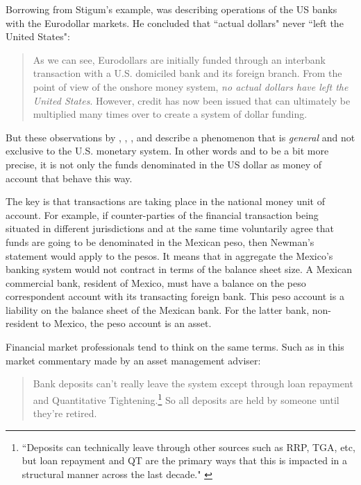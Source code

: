 Borrowing from Stigum's example, \cite{feygin2020} was describing operations of the US banks with the Eurodollar markets. He concluded that ``actual dollars" never ``left the United States":

\begin{quote}
As we can see, Eurodollars are initially funded through an interbank transaction with a U.S. domiciled bank and its foreign branch. From the point of view of the onshore money system, \textit{no actual dollars have left the United States}. However, credit has now been issued that can ultimately be multiplied many times over to create a system of dollar funding. \citep[emphasis added]{feygin2020}
\end{quote}

But these observations by \citep{hewson1975}, \citep{earley1981}, \citep{stigum2007}, \citep{newman2013} and \citep{feygin2020} describe a phenomenon that is \textit{general} and not exclusive to the U.S. monetary system. In other words and to be a bit more precise, it is not only the funds denominated in the US dollar as money of account that behave this way.

The key is that transactions are taking place in the national money unit of account.
For example, if counter-parties of the financial transaction being situated in different jurisdictions and at the same time voluntarily agree that funds are going to be denominated in the Mexican peso, then Newman's statement would apply to the pesos.
It means that in aggregate the Mexico's banking system would not contract in terms of the balance sheet size.
A Mexican commercial bank, resident of Mexico, must have a balance on the peso correspondent account with its transacting foreign bank.
This peso account is a liability on the balance sheet of the Mexican bank.
For the latter bank, non-resident to Mexico, the peso account is an asset.

Financial market professionals tend to think on the same terms. Such as in this market commentary made by an asset management adviser:

\begin{quote}
Bank deposits can't really leave the system except through loan repayment and Quantitative Tightening.\footnote{``Deposits can technically leave through other sources such as RRP, TGA, etc, but loan repayment and QT are the primary ways that this is impacted in a structural manner across the last decade." \citep{roche2023}} So all deposits are held by someone until they're retired. \citep{roche2023}
\end{quote}

